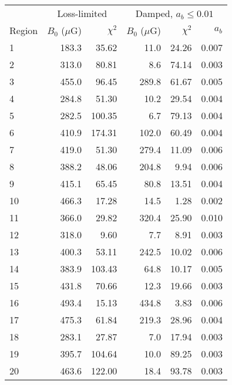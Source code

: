 \begin{tabular}{@{} l rr rrr @{}}
\toprule
{} & \multicolumn{2}{c}{Loss-limited}
   & \multicolumn{3}{c}{Damped, $a_b \leq 0.01$} \\
\cmidrule(lr){2-3} \cmidrule(l){4-6}
Region & $B_0$ ($\mu$G) & $\chi^2$
       & $B_0$ ($\mu$G) & $\chi^2$ & $a_b$ \\
\midrule
1 & 183.3 & 35.62 & 11.0 & 24.26 & 0.007 \\
2 & 313.0 & 80.81 & 8.6 & 74.14 & 0.003 \\
3 & 455.0 & 96.45 & 289.8 & 61.67 & 0.005 \\
\cmidrule{1-6}
4 & 284.8 & 51.30 & 10.2 & 29.54 & 0.004 \\
5 & 282.5 & 100.35 & 6.7 & 79.13 & 0.004 \\
6 & 410.9 & 174.31 & 102.0 & 60.49 & 0.004 \\
7 & 419.0 & 51.30 & 279.4 & 11.09 & 0.006 \\
8 & 388.2 & 48.06 & 204.8 & 9.94 & 0.006 \\
9 & 415.1 & 65.45 & 80.8 & 13.51 & 0.004 \\
10 & 466.3 & 17.28 & 14.5 & 1.28 & 0.002 \\
\cmidrule{1-6}
11 & 366.0 & 29.82 & 320.4 & 25.90 & 0.010 \\
12 & 318.0 & 9.60 & 7.7 & 8.91 & 0.003 \\
13 & 400.3 & 53.11 & 242.5 & 10.02 & 0.006 \\
\cmidrule{1-6}
14 & 383.9 & 103.43 & 64.8 & 10.17 & 0.005 \\
15 & 431.8 & 70.66 & 12.3 & 19.66 & 0.003 \\
16 & 493.4 & 15.13 & 434.8 & 3.83 & 0.006 \\
17 & 475.3 & 61.84 & 219.3 & 28.96 & 0.004 \\
\cmidrule{1-6}
18 & 283.1 & 27.87 & 7.0 & 17.94 & 0.003 \\
19 & 395.7 & 104.64 & 10.0 & 89.25 & 0.003 \\
20 & 463.6 & 122.00 & 18.4 & 93.78 & 0.003 \\
\bottomrule
\end{tabular}



